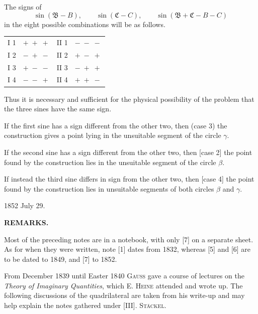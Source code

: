 
The signs of
\[ \sin(\mathfrak{B}-B), \qquad \sin(\mathfrak{C}-C), \qquad \sin(\mathfrak{B}+\mathfrak{C}-B-C) \]
in the eight possible combinations will be as follows.

\begin{center}
\begin{tabular}{cc|cc}
I 1 & $+\;+\;+$ & II 1 & $-\;-\;-$ \\
I 2 & $-\;+\;-$ & II 2 & $+\;-\;+$ \\
I 3 & $+\;-\;-$ & II 3 & $-\;+\;+$ \\
I 4 & $-\;-\;+$ & II 4 & $+\;+\;-$ \\
\end{tabular}
\end{center}

Thus it is necessary and sufficient for the physical possibility of the problem that the three sines have the same sign.

If the first sine has a sign different from the other two, then (case 3) the construction gives a point lying in the unsuitable segment of the circle $\gamma$.

If the second sine has a sign different from the other two, then [case 2] the point found by the construction lies in the unsuitable segment of the circle $\beta$.

If instead the third sine differs in sign from the other two, then [case 4] the point found by the construction lies in unsuitable segments of both circles $\beta$ and $\gamma$.

\hfill 1852 July 29.

\medskip

\begin{center}
\textbf{REMARKS.}
\end{center}

Most of the preceding notes are in a notebook, with only [7] on a separate sheet. As for when they were written, note [1] dates from 1832, whereas [5] and [6] are to be dated to 1849, and [7] to 1852.

From December 1839 until Easter 1840 \textsc{Gauss} gave a course of lectures on the \emph{Theory of Imaginary Quantities}, which E. \textsc{Heine} attended and wrote up. The following discussions of the quadrilateral are taken from his write-up and may help explain the notes gathered under [III]. \hfill \textsc{Stäckel}.
